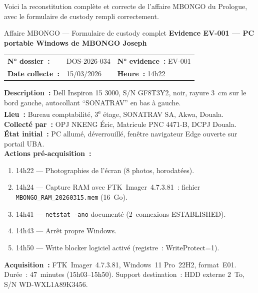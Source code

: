 Voici la reconstitution complète et correcte de l'affaire MBONGO du Prologue,
avec le formulaire de custody rempli correctement.

\begin{boxscenario}{Affaire MBONGO --- Formulaire de custody complet}
\textbf{Evidence EV-001 --- PC portable Windows de MBONGO Joseph}

\begin{tabular}{p{4cm}p{3cm}p{4cm}}
\textbf{N° dossier~:} & DOS-2026-034 &
\textbf{N° evidence~:} EV-001 \\
\textbf{Date collecte~:} & 15/03/2026 & \textbf{Heure~:} 14h22 \\
\end{tabular}

\textbf{Description~:} Dell Inspiron 15 3000, S/N GF8T3Y2, noir, rayure 3~cm
sur le bord gauche, autocollant ``SONATRAV'' en bas à gauche.\\

\textbf{Lieu~:} Bureau comptabilité, 3\textsuperscript{e} étage, SONATRAV SA,
Akwa, Douala.\\

\textbf{Collecté par~:} OPJ NKENG Éric, Matricule PNC 4471-B, DCPJ Douala.\\

\textbf{État initial~:} PC allumé, déverrouillé, fenêtre navigateur Edge
ouverte sur portail UBA.\\

\textbf{Actions pré-acquisition~:}
\begin{enumerate}
    \item 14h22 --- Photographies de l'écran (8 photos, horodatées).
    \item 14h24 --- Capture RAM avec FTK~Imager~4.7.3.81~:
          fichier \texttt{MBONGO\_RAM\_20260315.mem} (16~Go).
    \item 14h41 --- \texttt{netstat -ano} documenté (2~connexions ESTABLISHED).
    \item 14h43 --- Arrêt propre Windows.
    \item 14h50 --- Write blocker logiciel activé (registre~: WriteProtect=1).
\end{enumerate}

\textbf{Acquisition~:} FTK~Imager~4.7.3.81, Windows~11 Pro~22H2, format~E01.\\
Durée~: 47~minutes (15h03--15h50). Support destination~: HDD externe 2~To,
S/N WD-WXL1A89K3456.\\

\\
\\
\\
\\


\end{boxscenario}

